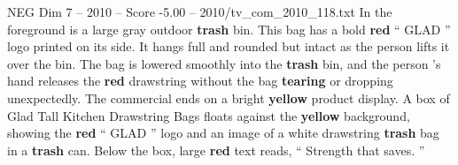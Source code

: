 \begin{textsample}{NEG Dim 7 – 2010 – Score -5.00 – 2010/tv\_com\_2010\_118.txt}
In the foreground is a large gray outdoor \textbf{trash} bin.
This bag has a bold \textbf{red} “ GLAD ” logo printed on its side.
It hangs full and rounded but intact as the person lifts it over the bin.
The bag is lowered smoothly into the \textbf{trash} bin, and the person ’s hand releases the \textbf{red} drawstring without the bag \textbf{tearing} or dropping unexpectedly.
The commercial ends on a bright \textbf{yellow} product display.
A box of Glad Tall Kitchen Drawstring Bags floats against the \textbf{yellow} background, showing the \textbf{red} “ GLAD ” logo and an image of a white drawstring \textbf{trash} bag in a \textbf{trash} can.
Below the box, large \textbf{red} text reads, “ Strength that saves. ”

\end{textsample}
